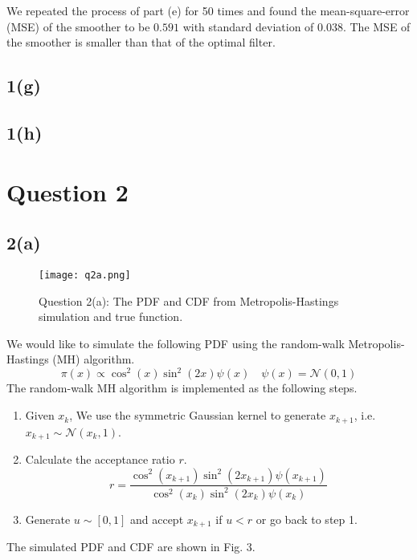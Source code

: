 \documentclass[a4paper, 11pt]{article}
\begin{document}
We repeated the process of part (e) for 50 times and found the mean-square-error (MSE) of the smoother to be $0.591$ with standard deviation of $0.038$. The MSE of the smoother is smaller than that of the optimal filter. 


\subsection*{1(g)}




\subsection*{1(h)}








\section*{Question 2}
\subsection*{2(a)}


\begin{figure}
	\begin{center}
		\texttt{[image: q2a.png]}
		\caption{Question 2(a): The PDF and CDF from Metropolis-Hastings simulation and true function. }
	\end{center}
\end{figure}

We would like to simulate the following PDF using the random-walk Metropolis-Hastings (MH) algorithm. 
\begin{equation}
\pi(x) \propto \cos^2(x)\sin^2(2x)\psi(x) \quad \psi(x) = \mathcal{N}(0,1)
\end{equation}
The random-walk MH algorithm is implemented as the following steps. 
\begin{enumerate}
\item Given $x_k$, We use the symmetric Gaussian kernel to generate $x_{k+1}$, i.e. $x_{k+1}\sim\mathcal{N}(x_k, 1)$. 
\item Calculate the acceptance ratio $r$. 
\begin{equation}
r = \frac{\cos^2(x_{k+1})\sin^2(2x_{k+1})\psi(x_{k+1})}{\cos^2(x_k)\sin^2(2x_k)\psi(x_k)}
\end{equation}
\item Generate $u\sim [0,1]$ and accept $x_{k+1}$ if $u < r$ or go back to step 1. 
\end{enumerate}
The simulated PDF and CDF are shown in Fig. 3. 
\end{document}

